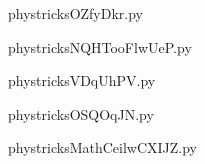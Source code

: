     

    \clearpage
    


    \newcommand{\CaptionFigOZfyDkr}{<+Type your caption here+>}
    \begin{center}
        
    \end{center}
    phystricksOZfyDkr.py

    

    \clearpage
    


    \newcommand{\CaptionFigNQHTooFlwUeP}{<+Type your caption here+>}
    \begin{center}
        
    \end{center}
    phystricksNQHTooFlwUeP.py

    

    \clearpage
    


    \newcommand{\CaptionFigVDqUhPV}{<+Type your caption here+>}
    \begin{center}
        
    \end{center}
    phystricksVDqUhPV.py

    

    \clearpage
    


    \newcommand{\CaptionFigOSQOqJN}{<+Type your caption here+>}
    \begin{center}
        
    \end{center}
    phystricksOSQOqJN.py

    

    \clearpage
    


    \newcommand{\CaptionFigMathCeilwCXIJZ}{<+Type your caption here+>}
    \begin{center}
        
    \end{center}
    phystricksMathCeilwCXIJZ.py

    

    \clearpage
    


